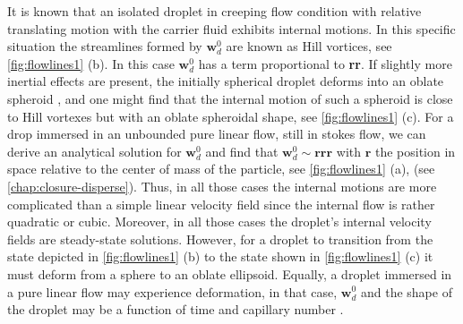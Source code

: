 It is known that an isolated droplet in creeping flow condition with relative translating motion with the carrier fluid exhibits internal motions. In this specific situation the streamlines formed by $\textbf{w}_d^0$ are known as Hill vortices, see \ref{fig:flowlines1} (b).
In this case $\textbf{w}_d^0$ has a term proportional to \textbf{rr}.  
If slightly more inertial effects are present, the initially spherical droplet deforms into an oblate spheroid \citep{taylor1964deformation}, and one might find that the internal motion of such a spheroid is close to Hill vortexes but with an oblate spheroidal shape, see \ref{fig:flowlines1} (c). 
For a drop immersed in an unbounded pure linear flow, still in stokes flow, we can derive an analytical solution for $\textbf{w}_d^0$ and find that $\textbf{w}_d^0 \sim \textbf{rrr}$ with $\textbf{r}$ the position in space relative to the center of mass of the particle, see \ref{fig:flowlines1} (a), (see \ref{chap:closure-disperse}). 
Thus, in all those cases the internal motions are more complicated than a simple linear velocity field since the internal flow is rather quadratic or cubic. 
Moreover, in all those cases the droplet's internal velocity fields are steady-state solutions.
However, for a droplet to transition from the state depicted in \ref{fig:flowlines1} (b) to the state shown in \ref{fig:flowlines1} (c) it must deform from a sphere to an oblate ellipsoid. 
Equally, a droplet immersed in a pure linear flow may experience deformation, in that case, $\textbf{w}_d^0$ and the shape of the droplet may be a function of time and capillary number \citet[chapter 7]{leal2007advanced}.

